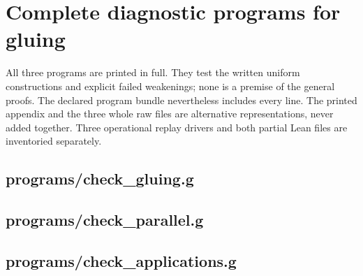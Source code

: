 \documentclass[11pt,a4paper]{article}
\begin{document}
\section*{Complete diagnostic programs for gluing}
All three programs are printed in full. They test the written uniform constructions and explicit failed weakenings; none is a premise of the general proofs. The declared program bundle nevertheless includes every line. The printed appendix and the three whole raw files are alternative representations, never added together. Three operational replay drivers and both partial Lean files are inventoried separately.
\subsection*{programs/check\_gluing.g}
\subsection*{programs/check\_parallel.g}
\subsection*{programs/check\_applications.g}
\end{document}
